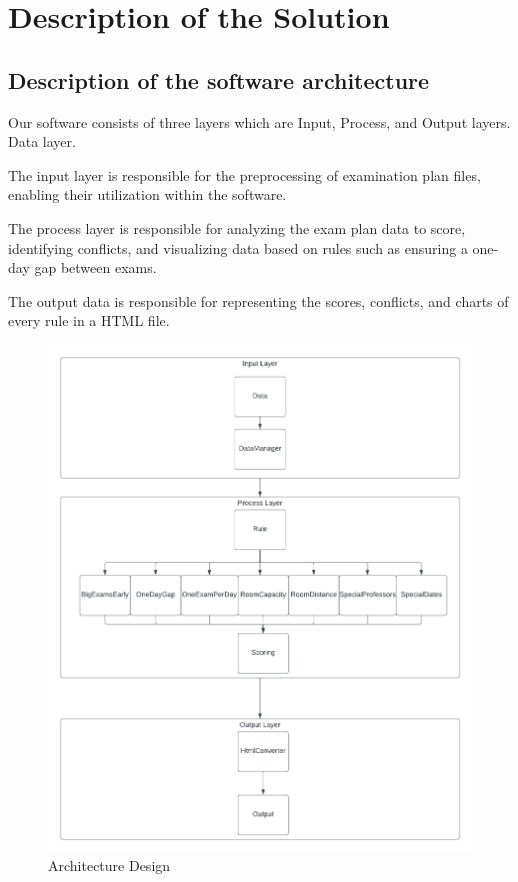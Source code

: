


\section{Description of the Solution}
\subsection{Description of the software architecture}



Our software consists of three layers which are Input, Process, and Output layers. Data layer.

\vspace{\baselineskip}

The input layer is responsible for the preprocessing of examination plan files, enabling their utilization within the software.

\vspace{\baselineskip}

The process layer is responsible for analyzing the exam plan data to score, identifying conflicts, and visualizing data based on rules such as ensuring a one-day gap between exams.


\vspace{\baselineskip}

The output data is responsible for representing the scores, conflicts, and charts of every rule in a HTML file.

\FloatBarrier
\begin{figure}[ht]
    \centering
    \includegraphics[width=160mm]{images/architecture.png}
    \caption{Architecture Design}
    \label{fig:entrance-screen}
\end{figure}
\FloatBarrier



